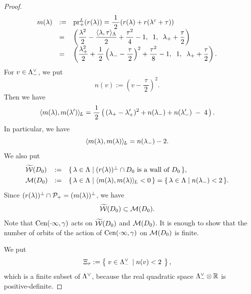 \documentclass{amsart} %
\begin{document}
\begin{proof}
\begin{equation}
\begin{array}{lll}
m(\lambda) &:=& \operatorname{pr}^{L}_{+}(r(\lambda))=\dfrac{\;1\;}{2}(r(\lambda)+
r(\lambda^\varepsilon+\tau))\\
&=&
\left(\dfrac{\lambda^2}{2}-\dfrac{\langle \lambda, \tau \rangle_{\Lambda}}{2}+\dfrac{\tau^2}{4}-1, 
\;\; 1,\;\; {\lambda}_{+} +\dfrac{\tau}{2}\right)\\
&=&
\left(
\dfrac{{\lambda}_{+}^2}{2}+\dfrac{1}{\,2\,}\left({\lambda}_{-}-\dfrac{\tau}{\,2\,}\right)^2+\dfrac{\tau^2}{8}-1, 
\;\; 1,\;\; {\lambda}_{+} +\dfrac{\tau}{2}\right).
\end{array}
\end{equation}
%
For $v\in \Lambda_{-}^{\vee}$,
we put
\[
n(v):=\left(v-\dfrac{\,\tau\,}{2}\right)^2.
\]
Then we have
%
\begin{equation}\label{eq:mlmlsprime}
 \langle m(\lambda), m(\lambda^{\prime}) \rangle_{\hskip -1pt L} =\frac{1}{\,2\,}
 \left(\,
({\lambda}_{+} - {\lambda}_{+}^{\prime} )^2
+
n({\lambda}_{-})
+
n({\lambda}_{-}^{\prime})
\;-\;4 
\,\right).
\end{equation}
%
In particular, we have 
%
\[
\langle m(\lambda), m(\lambda) \rangle_{\hskip -1pt L}=n({\lambda}_{-})-2.
\]
%
We also put 
\[
\renewcommand{\arraystretch}{1.3}
\begin{array}{lll}
\tilwalls(D_0) &:= & \set{\lambda\in \Leech}{\textrm{$(\LeechRoot{\lambda})\sperp \cap D_0$ is a wall of $D_0$}}, \\
\MMM(D_0) &:=& \set{\lambda\in \Leech}{\intfL{m(\lambda), m(\lambda)}<0}=\set{\lambda\in \Leech}{n(\lambdaminus)<2}.
\end{array}
\]
Since $(r(\lambda))^{\perp}\cap \mathord{\mathcal{P}}_{+}=(m(\lambda) )^{\perp}$,
we have 
%
\begin{equation}\label{eq:tilWWWMMM}
\widetilde{\mathord{\mathcal{W}}}(D_0)\subset \mathord{\mathcal{M}}(D_0).
\end{equation}
%
Note that  $\mathrm{Cen}(\cdot \infty, \gamma)$
acts on  %
$\widetilde{\mathord{\mathcal{W}}}(D_0)$ and $\mathord{\mathcal{M}}(D_0)$.
It is enough to show that 
 the number of orbits of the action of $\mathrm{Cen}(\cdot \infty, \gamma)$ on $ \mathord{\mathcal{M}}(D_0)$
is finite.
\par
We put
%
\begin{equation}\label{eq:Xi}
\Xi_{\tau}:=\left\{\; {v\in \Lambda_{-}^{\vee} } \; \left\vert \; {n(v)<2} \; \right.\right \},
\end{equation}
%
which is a finite subset of $\Lambda^{\vee}$, because 
the real quadratic space 
$ \Lambda_{-}^{\vee}\otimes \mathord{\mathbb{R}}$ is positive-definite.

\end{proof}
\end{document}
